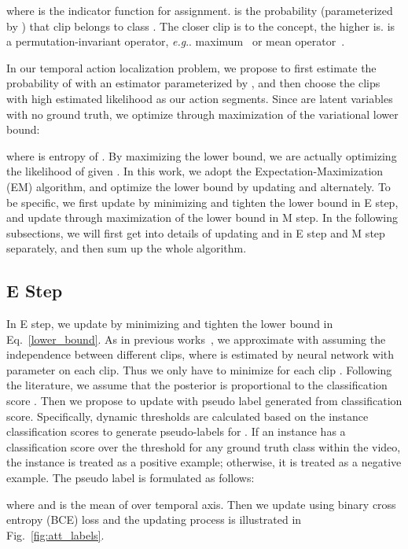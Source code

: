 \documentclass[runningheads]{llncs}
\makeatletter
\DeclareRobustCommand\onedot{\futurelet\@let@token\@onedot}
\def\@onedot{\ifx\@let@token.\else.\null\fi\xspace}
\def\eg{\emph{e.g}\onedot} \def\Eg{\emph{E.g}\onedot}
\makeatother
\begin{document}
where  is the indicator function for assignment.  is the probability (parameterized by ) that clip  belongs to class . The closer clip  is to the concept, the higher  is.  is a permutation-invariant operator, \eg maximum~\cite{zhang2002dd} or mean operator~\cite{ilse2018attention}.

\smallskip
In our temporal action localization problem, we propose to first estimate the probability of  with an estimator  parameterized by , and then choose the clips with high estimated likelihood as our action segments. Since  are latent variables with no ground truth, we optimize  through maximization of the variational lower bound:


where  is entropy of . By maximizing the lower bound, we are actually optimizing the likelihood of  given . In this work, we adopt the Expectation-Maximization (EM) algorithm, and optimize the lower bound by updating  and  alternately. To be specific, we first update  by minimizing  and tighten the lower bound in E step, and update  through maximization of the lower bound in M step. In the following subsections, we will first get into details of updating  and  in E step and M step separately, and then sum up the whole algorithm.


\subsection{E Step}\label{E}
In E step, we update  by minimizing  and tighten the lower bound in Eq.~\ref{lower_bound}. As in previous works~\cite{nguyen2018weakly,nguyen2019weakly}, we approximate  with  assuming the independence between different clips, where  is estimated by neural network with parameter  on each clip. Thus we only have to minimize  for each clip . Following the literature, we assume that the posterior  is proportional to the classification score . Then we propose to update  with pseudo label generated from classification score. Specifically, dynamic thresholds are calculated based on the instance classification scores to generate pseudo-labels for . If an instance has a classification score over the threshold for any ground truth class within the video, the instance is treated as a positive example; otherwise, it is treated as a negative example. The pseudo label is formulated as follows:


where  and  is the mean of  over temporal axis.  Then we update  using binary cross entropy (BCE) loss and the updating process is illustrated in Fig.~\ref{fig:att_labels}.
\end{document}
